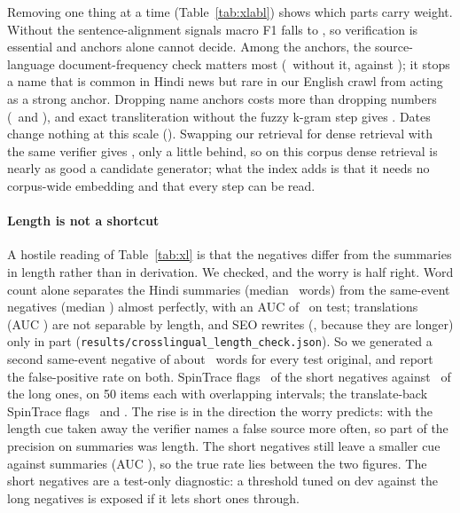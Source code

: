 \documentclass[11pt,a4paper]{article}
\newcommand{\code}[1]{\texttt{#1}}
\begin{document}
Removing one thing at a time (Table~\ref{tab:xlabl}) shows which parts carry weight. Without the sentence-alignment signals macro F1 falls to \nAblNoAlign, so verification is essential and anchors alone cannot decide. Among the anchors, the source-language document-frequency check matters most (\nAblNoDf\ without it, against \nAblFull); it stops a name that is common in Hindi news but rare in our English crawl from acting as a strong anchor. Dropping name anchors costs more than dropping numbers (\nAblNoNames\ and \nAblNoNumbers), and exact transliteration without the fuzzy k-gram step gives \nAblTranslitExact. Dates change nothing at this scale (\nAblNoDates). Swapping our retrieval for dense retrieval with the same verifier gives \nAblDenseVerify, only a little behind, so on this corpus dense retrieval is nearly as good a candidate generator; what the index adds is that it needs no corpus-wide embedding and that every step can be read.

\paragraph{Length is not a shortcut}
\label{sec:length}
A hostile reading of Table~\ref{tab:xl} is that the negatives differ from the summaries in length rather than in derivation. We checked, and the worry is half right. Word count alone separates the Hindi summaries (median \nLenSumMed\ words) from the same-event negatives (median \nLenLongMed) almost perfectly, with an AUC of \nLenAucSum\ on test; translations (AUC \nLenAucTrans) are not separable by length, and SEO rewrites (\nLenAucSeo, because they are longer) only in part (\code{results/crosslingual\_length\_check.json}). So we generated a second same-event negative of about \nLenShortMed\ words for every test original, and report the false-positive rate on both. SpinTrace flags \nXlFprShort\ of the short negatives against \nXlFprSame\ of the long ones, on 50 items each with overlapping intervals; the translate-back SpinTrace flags \nBtSpinFprShort\ and \nBtSpinFprSame. The rise is in the direction the worry predicts: with the length cue taken away the verifier names a false source more often, so part of the precision on summaries was length. The short negatives still leave a smaller cue against summaries (AUC \nLenAucSumShort), so the true rate lies between the two figures. The short negatives are a test-only diagnostic: a threshold tuned on dev against the long negatives is exposed if it lets short ones through.
\end{document}
